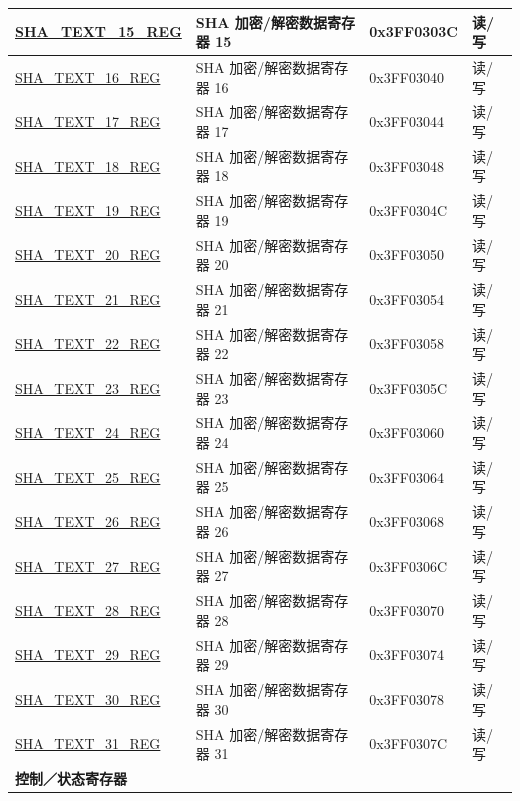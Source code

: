 \begin{longtable}{ | p{5cm} | p{7.2cm} | p{1.9cm} | p{0.9cm} | }
\hyperref[regdesc:SHATEXTnREG]{SHA\_TEXT\_15\_REG} & SHA 加密/解密数据寄存器 15 & 0x3FF0303C & 读/写\\ \hline
\hyperref[regdesc:SHATEXTnREG]{SHA\_TEXT\_16\_REG} &SHA 加密/解密数据寄存器 16 & 0x3FF03040 & 读/写\\ \hline
\hyperref[regdesc:SHATEXTnREG]{SHA\_TEXT\_17\_REG} & SHA 加密/解密数据寄存器 17 & 0x3FF03044 & 读/写\\ \hline
\hyperref[regdesc:SHATEXTnREG]{SHA\_TEXT\_18\_REG} &SHA 加密/解密数据寄存器 18 & 0x3FF03048 & 读/写\\ \hline
\hyperref[regdesc:SHATEXTnREG]{SHA\_TEXT\_19\_REG} & SHA 加密/解密数据寄存器 19 & 0x3FF0304C & 读/写\\ \hline
\hyperref[regdesc:SHATEXTnREG]{SHA\_TEXT\_20\_REG} &SHA 加密/解密数据寄存器 20 & 0x3FF03050 & 读/写\\ \hline
\hyperref[regdesc:SHATEXTnREG]{SHA\_TEXT\_21\_REG} &SHA 加密/解密数据寄存器 21 & 0x3FF03054 & 读/写\\ \hline
\hyperref[regdesc:SHATEXTnREG]{SHA\_TEXT\_22\_REG} & SHA 加密/解密数据寄存器 22 & 0x3FF03058 &读/写\\ \hline
\hyperref[regdesc:SHATEXTnREG]{SHA\_TEXT\_23\_REG} & SHA 加密/解密数据寄存器 23 & 0x3FF0305C & 读/写\\ \hline
\hyperref[regdesc:SHATEXTnREG]{SHA\_TEXT\_24\_REG} & SHA 加密/解密数据寄存器 24 & 0x3FF03060 & 读/写\\ \hline
\hyperref[regdesc:SHATEXTnREG]{SHA\_TEXT\_25\_REG} &SHA 加密/解密数据寄存器 25 & 0x3FF03064 & 读/写\\ \hline
\hyperref[regdesc:SHATEXTnREG]{SHA\_TEXT\_26\_REG} &SHA 加密/解密数据寄存器 26 & 0x3FF03068 & 读/写\\ \hline
\hyperref[regdesc:SHATEXTnREG]{SHA\_TEXT\_27\_REG} & SHA 加密/解密数据寄存器 27 & 0x3FF0306C & 读/写\\ \hline
\hyperref[regdesc:SHATEXTnREG]{SHA\_TEXT\_28\_REG} & SHA 加密/解密数据寄存器 28 & 0x3FF03070 & 读/写\\ \hline
\hyperref[regdesc:SHATEXTnREG]{SHA\_TEXT\_29\_REG} & SHA 加密/解密数据寄存器 29 & 0x3FF03074 & 读/写\\ \hline
\hyperref[regdesc:SHATEXTnREG]{SHA\_TEXT\_30\_REG} & SHA 加密/解密数据寄存器 30 & 0x3FF03078 & 读/写\\ \hline
\hyperref[regdesc:SHATEXTnREG]{SHA\_TEXT\_31\_REG} & SHA 加密/解密数据寄存器 31 & 0x3FF0307C & 读/写\\ \hline
\multicolumn{4}{|l|}{\textbf{控制／状态寄存器}} \\ \hline

\end{longtable}
